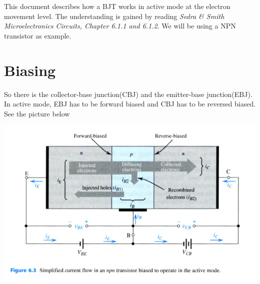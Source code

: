 \documentclass{article}
\begin{document}
	This document describes how a BJT works in active mode at the electron movement level.
	The understanding is gained by reading \textit{Sedra \& Smith Microelectronics Circuits, Chapter 6.1.1 and 6.1.2}. We will be using a NPN transistor as example.
	\section{Biasing}
		So there is the collector-base junction(CBJ) and the emitter-base junction(EBJ). In active mode, EBJ has to be forward biased and CBJ has to be reversed biased. See the picture below
		\begin{center}
			\includegraphics[width=\textwidth]{img/npn_active_mode.png}
		\end{center}
\end{document}
